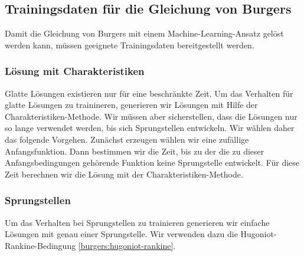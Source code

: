 %
%
%
\subsection{Trainingsdaten für die Gleichung von Burgers\label{burgers:training}}
Damit die Gleichung von Burgers mit einem Machine-Learning-Ansatz gelöst
werden kann, müssen geeignete Trainingsdaten bereitgestellt werden.


\subsubsection{Lösung mit Charakteristiken}
Glatte Lösungen existieren nur für eine beschränkte Zeit.
Um das Verhalten für glatte Lösungen zu trainineren, generieren
wir Lösungen mit Hilfe der Charakteristiken-Methode.
Wir müssen aber sicherstellen, dass die Lösungen nur so lange verwendet
werden, bis sich Sprungstellen entwickeln.
Wir wählen daher das folgende Vorgehen.
Zunächst erzeugen wählen wir eine zufällige Anfangsfunktion.
Dann bestimmen wir die Zeit, bis zu der die zu dieser Anfangsbedingungen
gehörende Funktion keine Sprungstelle entwickelt.
Für diese Zeit berechnen wir die Lösung mit der Charakteristiken-Methode.

\subsubsection{Sprungstellen}
Um das Verhalten bei Sprungstellen zu trainieren generieren wir
einfache Lösungen mit genau einer Sprungstelle.
Wir verwenden dazu die Hugoniot-Rankine-Bedingung \eqref{burgers:hugoniot-rankine}.


